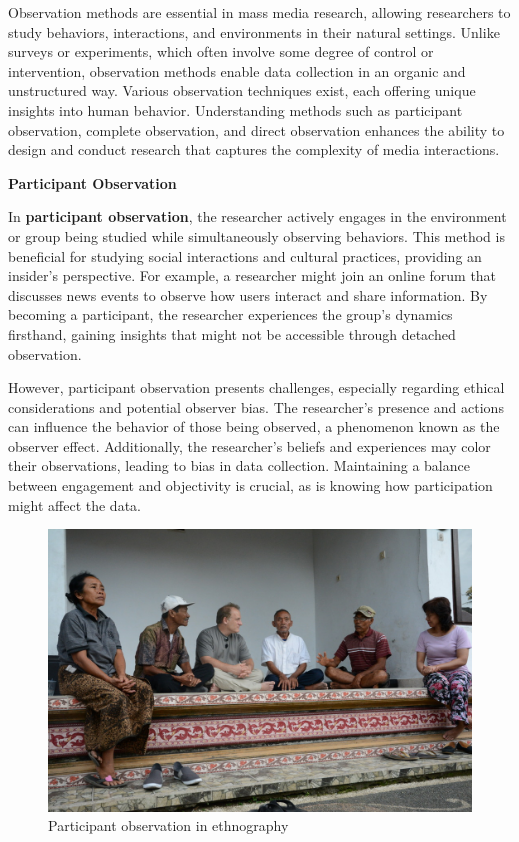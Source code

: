 \documentclass[
]{book}
\begin{document}
Observation methods are essential in mass media research, allowing researchers to study behaviors, interactions, and environments in their natural settings. Unlike surveys or experiments, which often involve some degree of control or intervention, observation methods enable data collection in an organic and unstructured way. Various observation techniques exist, each offering unique insights into human behavior. Understanding methods such as participant observation, complete observation, and direct observation enhances the ability to design and conduct research that captures the complexity of media interactions.

\textbf{Participant Observation}

In \textbf{participant observation}, the researcher actively engages in the environment or group being studied while simultaneously observing behaviors. This method is beneficial for studying social interactions and cultural practices, providing an insider's perspective. For example, a researcher might join an online forum that discusses news events to observe how users interact and share information. By becoming a participant, the researcher experiences the group's dynamics firsthand, gaining insights that might not be accessible through detached observation.

However, participant observation presents challenges, especially regarding ethical considerations and potential observer bias. The researcher's presence and actions can influence the behavior of those being observed, a phenomenon known as the observer effect. Additionally, the researcher's beliefs and experiences may color their observations, leading to bias in data collection. Maintaining a balance between engagement and objectivity is crucial, as is knowing how participation might affect the data.

\begin{figure}
\centering
\includegraphics[width=1\textwidth,height=\textheight]{images/part-observation.jpg}
\caption{Participant observation in ethnography}
\end{figure}
\end{document}
